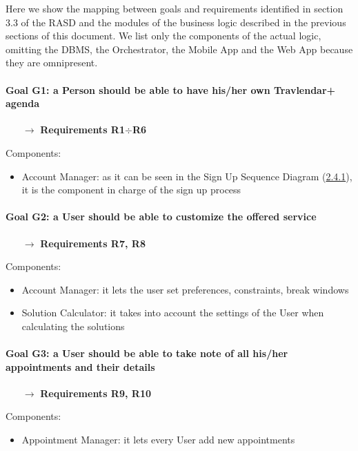 \newcommand{\requirements}[1]{
	\begin{itemize}
		\item[$\rightarrow$] \textbf{Requirements #1}\mbox{} %
	\end{itemize}
}

Here we show the mapping between goals and requirements identified in section 3.3 of the RASD and the modules of the business logic described in the previous sections of this document. We list only the components of the actual logic, omitting the DBMS, the Orchestrator, the Mobile App and the Web App because they are omnipresent.

\paragraph{Goal G1: a Person should be able to have his/her own Travlendar+ agenda}
	\requirements{R1$\div$R6}
	Components:
	\begin{itemize}[label=--]
		\item Account Manager: as it can be seen in the Sign Up Sequence Diagram (\hyperref[sect:sd_signUp]{2.4.1}), it is the component in charge of the sign up process
	\end{itemize}

\paragraph{Goal G2: a User should be able to customize the offered service}
	\requirements{R7, R8}
	Components:
	\begin{itemize}[label=--]
		\item Account Manager: it lets the user set preferences, constraints, break windows
		\item Solution Calculator: it takes into account the settings of the User when calculating the solutions
	\end{itemize}

\paragraph{Goal G3: a User should be able to take note of all his/her appointments and their details}
	\requirements{R9, R10}
	Components:
	\begin{itemize}[label=--]
		\item Appointment Manager: it lets every User add new appointments
	\end{itemize}

